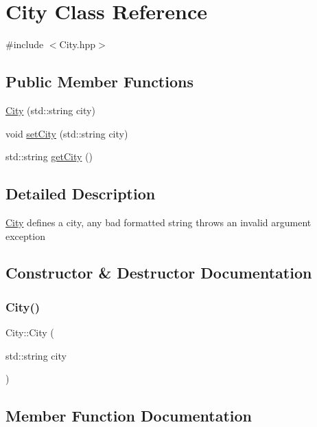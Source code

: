 \hypertarget{class_city}{}\section{City Class Reference}
\label{class_city}


{\ttfamily \#include $<$City.\+hpp$>$}

\subsection*{Public Member Functions}
\begin{DoxyCompactItemize}
\item 
\mbox{\hyperlink{class_city_adf38f4f0d2af6077f08df3303be0e926}{City}} (std\+::string city)
\item 
void \mbox{\hyperlink{class_city_a9f2a2f59076c2ec2591d3713e8ee29c5}{set\+City}} (std\+::string city)
\item 
std\+::string \mbox{\hyperlink{class_city_a6c7e39be8514b529f011a2f220e4de0e}{get\+City}} ()
\end{DoxyCompactItemize}


\subsection{Detailed Description}
\mbox{\hyperlink{class_city}{City}} defines a city, any bad formatted string throws an invalid argument exception 

\subsection{Constructor \& Destructor Documentation}
\mbox{\label{class_city_adf38f4f0d2af6077f08df3303be0e926}} 
\subsubsection{\texorpdfstring{City()}{City()}}
{\footnotesize\ttfamily City\+::\+City (\begin{DoxyParamCaption}\item[{std\+::string}]{city }\end{DoxyParamCaption})}



\subsection{Member Function Documentation}
\mbox{\label{class_city_a6c7e39be8514b529f011a2f220e4de0e}} 
